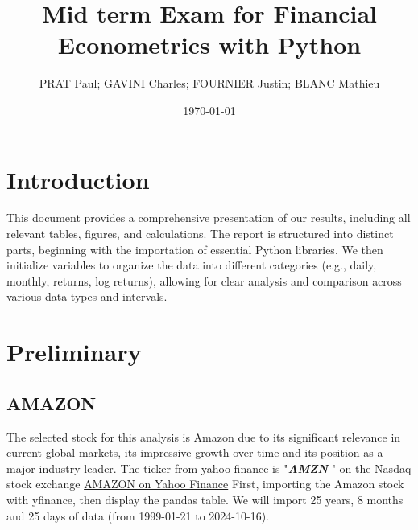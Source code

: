 \documentclass{article}
\begin{document}
\title{Mid term Exam for Financial Econometrics with Python}
\author{PRAT Paul; GAVINI Charles; FOURNIER Justin; BLANC Mathieu}
\date{\today}

\maketitle %

\tableofcontents %

\section{Introduction}


This document provides a comprehensive presentation of our results, 
including all relevant tables, figures, and calculations. 
The report is structured into distinct parts, beginning with the importation of essential Python libraries. 
We then initialize variables to organize the data into different categories (e.g., daily, monthly, returns, log returns), 
allowing for clear analysis and comparison across various data types and intervals.


\section{Preliminary}


\subsection{AMAZON}

The selected stock for this analysis is Amazon due to its significant relevance in current global markets, its impressive growth over time and its position as a major industry leader.
The ticker from yahoo finance is "\textbf{\textit{AMZN}} " on the Nasdaq stock exchange \href{https://finance.yahoo.com/quote/AMZN/.}{AMAZON on Yahoo Finance}
First, importing the Amazon stock with yfinance, then display the pandas table.
We will import 25 years, 8 months and 25 days of data (from 1999-01-21 to 2024-10-16).
\end{document}
